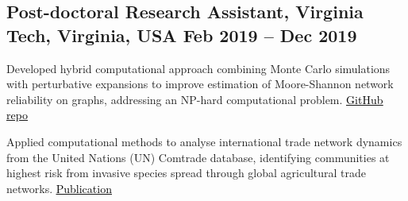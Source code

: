 \subsection{Post-doctoral Research Assistant, Virginia Tech, Virginia, USA \hfill Feb 2019 -- Dec 2019}

\begin{zitemize}
 
\item Developed hybrid computational approach combining Monte Carlo simulations with perturbative expansions to improve estimation of Moore-Shannon network reliability on graphs, addressing an NP-hard computational problem.
{\href{https://github.com/NSSAC/reliability}{\underline{
\textcolor{black}{GitHub repo}
}}}

\item Applied computational methods to analyse international trade network dynamics from the United Nations (UN) Comtrade database, identifying communities at highest risk from invasive species spread through global agricultural trade networks. {\href{https://link.springer.com/chapter/10.1007/978-3-031-21131-7_21}{\underline{\textcolor{black}{Publication}}}}
\end{zitemize}